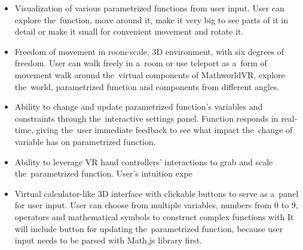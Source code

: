 \begin{itemize}
\item{Visualization of various parametrized functions from user input. User can explore the~function, move around it, make it very big to see parts of it in detail or make it small for convenient movement and rotate it.}
\item{Freedom of movement in room-scale, 3D environment, with six degrees of freedom. User can walk freely in a~room or use teleport as a~form of movement walk around the~virtual components of MathworldVR, explore the~world, parametrized function and components from different angles.}
\item{Ability to change and update parametrized function's variables and constraints through the~interactive settings panel. Function responds in real-time, giving the~user immediate feedback to see what impact the~change of variable has on parametrized function.}
\item{Ability to leverage VR hand controllers' interactions to grab and scale the~parametrized function. User's intuition expe}
\item{Virtual calculator-like 3D interface with clickable buttons to serve as a~panel for user input. User can choose from multiple variables, numbers from 0 to 9, operators and mathematical symbols to construct complex functions with It will include button for updating the~parametrized function, because user input needs to be parsed with Math.js library first.}
\end{itemize}


